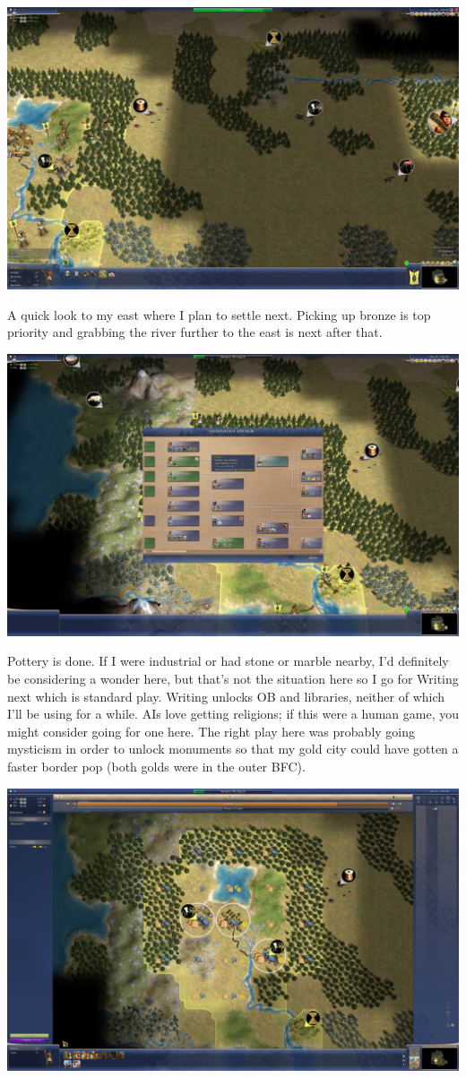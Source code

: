 \documentclass[10pt]{article}
\begin{document}
\includegraphics[width=1.0\textwidth]{16}

A quick look to my east where I plan to settle next. Picking up bronze is top priority and grabbing the
river further to the east is next after that.

\includegraphics[width=1.0\textwidth]{17}

Pottery is done. If I were industrial or had stone or marble nearby, I'd definitely be considering a wonder
here, but that's not the situation here so I go for Writing next which is standard play. Writing unlocks
OB and libraries, neither of which I'll be using for a while. AIs love getting religions; if this were a human
game, you might consider going for one here. The right play here was probably going mysticism in order to unlock
monuments so that my gold city could have gotten a faster border pop (both golds were in the outer BFC).

\includegraphics[width=1.0\textwidth]{18}
\end{document}
